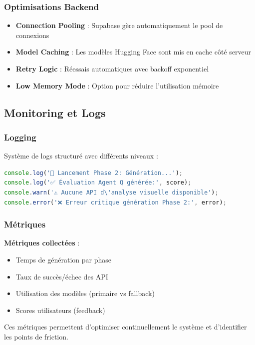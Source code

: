 \subsubsection{Optimisations Backend}

\begin{itemize}[leftmargin=*]
    \item \textbf{Connection Pooling} : Supabase gère automatiquement le pool de connexions
    \item \textbf{Model Caching} : Les modèles Hugging Face sont mis en cache côté serveur
    \item \textbf{Retry Logic} : Réessais automatiques avec backoff exponentiel
    \item \textbf{Low Memory Mode} : Option pour réduire l'utilisation mémoire
\end{itemize}

\subsection{Monitoring et Logs}

\subsubsection{Logging}

Système de logs structuré avec différents niveaux :

\begin{lstlisting}[language=TypeScript, caption=Système de logging]
console.log('🎨 Lancement Phase 2: Génération...');
console.log('✅ Évaluation Agent Q générée:', score);
console.warn('⚠️ Aucune API d\'analyse visuelle disponible');
console.error('❌ Erreur critique génération Phase 2:', error);
\end{lstlisting}

\subsubsection{Métriques}

\textbf{Métriques collectées} :
\begin{itemize}[leftmargin=*]
    \item Temps de génération par phase
    \item Taux de succès/échec des API
    \item Utilisation des modèles (primaire vs fallback)
    \item Scores utilisateurs (feedback)
\end{itemize}

Ces métriques permettent d'optimiser continuellement le système et d'identifier les points de friction.
